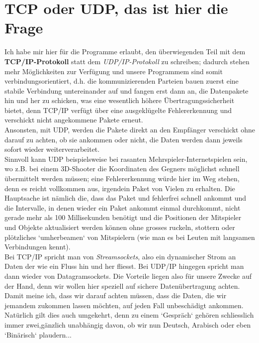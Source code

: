 \documentclass[b5paper,10pt,dvips,fleqn,titlepage,twoside]{book}
\begin{document}
\section{TCP oder UDP, das ist hier die Frage}
Ich habe mir hier für die Programme erlaubt, den überwiegenden Teil mit dem \textbf{TCP/IP-Protokoll} statt dem \emph{UDP/IP-Protokoll} zu schreiben; dadurch stehen mehr Möglichkeiten zur Verfügung und unsere Programmem sind somit verbindungsorientiert, d.h. die kommunizierenden Parteien bauen zuerst eine stabile Verbindung untereinander auf und fangen erst dann an, die Datenpakete hin und her zu schicken, was eine wesentlich höhere Übertragungssicherheit bietet, denn TCP/IP verfügt über eine ausgeklügelte Fehlererkennung und verschickt nicht angekommene Pakete erneut.\\
Ansonsten, mit UDP, werden die Pakete direkt an den Empfänger verschickt ohne darauf zu achten, ob sie ankommen oder nicht, die Daten werden dann jeweils sofort wieder weiterverarbeitet.\\
Sinnvoll kann UDP beispielsweise bei rasanten Mehrspieler-Internetspielen sein, wo z.B. bei einem 3D-Shooter die Koordinaten des Gegners möglichst schnell übermittelt werden müssen; eine Fehlererkennung würde hier im Weg stehen, denn es reicht vollkommen aus, irgendein Paket von Vielen zu erhalten. Die Hauptsache ist nämlich die, dass das Paket und fehlerfrei schnell ankommt und die Intervalle, in denen wieder ein Paket ankommt einmal durchkommt, nicht gerade mehr als 100 Millisekunden benötigt und die Positionen der Mitspieler und Objekte aktualisiert werden können ohne grosses ruckeln, stottern oder plötzliches `umherbeamen` von Mitspielern (wie man es bei Leuten mit langsamen Verbindungen kennt).\\
Bei TCP/IP spricht man von \emph{Streamsockets}, also ein dynamischer Strom an Daten der wie ein Fluss hin und her fliesst. Bei UDP/IP hingegen spricht man dann wieder von Datagramsockets.
Die Vorteile liegen also für unsere Zwecke auf der Hand, denn wir wollen hier speziell auf sichere Datenübertragung achten. Damit meine ich, dass wir darauf achten müssen, dass die Daten, die wir jemandem zukommen lassen möchten, auf jeden Fall unbeschädigt ankommen. Natürlich gilt dies auch umgekehrt, denn zu einem `Gespräch` gehören schliesslich immer zwei,gänzlich unabhängig davon, ob wir nun Deutsch, Arabisch oder eben `Binärisch` plaudern...
\end{document}
